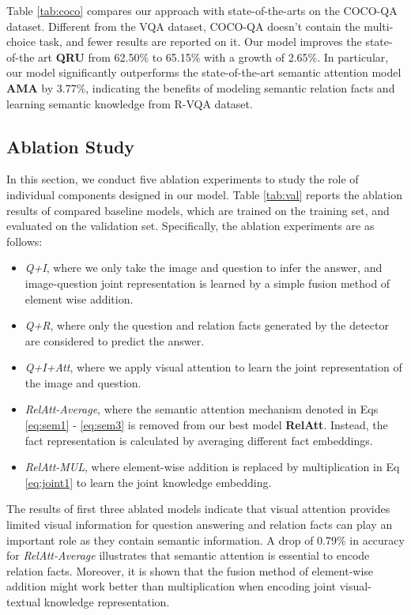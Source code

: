 \documentclass[sigconf]{acmart}
\begin{document}
Table  \ref{tab:coco} compares our approach with state-of-the-arts on the COCO-QA dataset. 
Different from the VQA dataset, COCO-QA doesn't contain the multi-choice task, and fewer results are reported on it.
Our model improves the state-of-the art \textbf{QRU} \cite{li2016visual} from 62.50\% to 65.15\% with a growth of 2.65\%. In particular, our model significantly outperforms the state-of-the-art semantic attention model \textbf{AMA} \cite{wu2016ask} by 3.77\%, indicating the benefits of modeling semantic relation facts
and learning semantic knowledge from R-VQA dataset.		





\subsection{Ablation Study}


In this section, we conduct five ablation experiments to study the role of individual components designed in our model. Table \ref{tab:val} reports the ablation results of compared baseline models, which are trained on the training set, and evaluated on the validation set. Specifically, the ablation experiments are as follows:
\begin{itemize}
	\item \textit{Q+I}, where we only take the image and question to infer the answer, and image-question joint representation is learned by a simple fusion method of element wise addition.
	\item \textit{Q+R}, where only the question and relation facts generated by the detector are considered to predict the answer.
	\item \textit{Q+I+Att}, where we apply visual attention to learn the joint representation of the image and question.
	\item \textit{RelAtt-Average}, where the semantic attention mechanism denoted in Eqs \ref{eq:sem1} - \ref{eq:sem3} is removed from our best model \textbf{RelAtt}. Instead, the fact representation is calculated by averaging different fact embeddings.
\item \textit{RelAtt-MUL}, where element-wise addition is replaced by multiplication in Eq \ref{eq:joint1} to learn the joint knowledge embedding.
\end{itemize}

The results of first three ablated models indicate that visual attention provides limited visual information for question answering and relation facts can play an important role as they contain semantic information. A drop of 0.79\% in accuracy for \textit{RelAtt-Average} illustrates that semantic attention is essential to encode relation facts. Moreover, it is shown that the fusion method of element-wise addition might work better than multiplication when encoding joint visual-textual knowledge representation.
\end{document}
